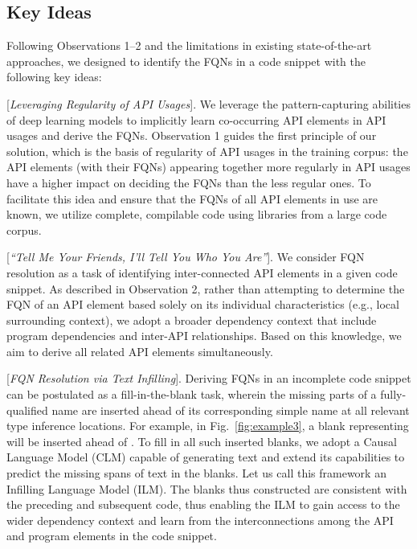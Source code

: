 \subsection{Key Ideas}
\label{sec:key}
Following Observations 1--2 and the limitations in existing state-of-the-art approaches, we designed {\tool} to identify the FQNs in a code snippet with the following key ideas:

\vspace{2pt}
 [{\em Leveraging Regularity of API Usages}].  
We leverage the pattern-capturing abilities of deep learning models to implicitly learn co-occurring API elements in API usages and derive the FQNs. Observation 1 guides the first principle of our solution, which is the basis of regularity of API usages in the training corpus: the API elements (with their FQNs) appearing together more regularly in API usages have a higher impact on deciding the FQNs than the less regular ones. To facilitate this idea and ensure that the FQNs of all API elements in use are known, we utilize complete, compilable code using libraries from a large code corpus.

\vspace{2pt}
 [{\em ``Tell Me Your Friends, I'll Tell You Who You Are''}]. 
We consider FQN resolution as a task of identifying inter-connected API elements in a given code snippet. As described in Observation 2, rather than attempting to determine the FQN of an API element based solely on its individual characteristics (e.g., local surrounding context), we adopt a broader dependency context that include program dependencies and inter-API relationships. Based on this knowledge, we aim to derive all related API elements simultaneously.


\vspace{2pt}
 [{\em FQN Resolution via Text Infilling}].
Deriving FQNs in an incomplete code snippet can be postulated as a fill-in-the-blank task, wherein the missing parts of a fully-qualified name are inserted ahead of its corresponding simple name at all relevant type inference locations. For example, in Fig.~\ref{fig:example3}, a blank representing  will be inserted ahead of . To fill in all such inserted blanks, we adopt a Causal Language Model (CLM) capable of generating text and extend its capabilities to predict the missing spans of text in the blanks. Let us call this framework an Infilling Language Model (ILM). The blanks thus constructed are consistent with the preceding and subsequent code, thus enabling the ILM to gain access to the wider dependency context and learn from the interconnections among the API and program elements in the code snippet.